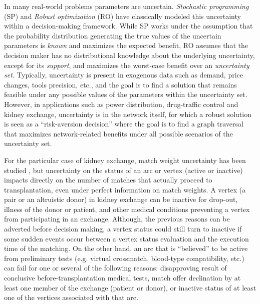 \documentclass{article}
\begin{document}
	In many real-world problems parameters are uncertain. \textit{Stochastic programming} (SP) and \textit{Robust optimization} (RO) have classically modeled this uncertainty within a decision-making framework. While SP works under the assumption that the probability distribution generating the true values of the uncertain parameters is \textit{known} and maximizes the expected benefit, RO assumes that the decision maker has no distributional knowledge about the underlying uncertainty, except for its \textit{support}, and maximizes the worst-case benefit over an \textit{uncertainty set}. Typically, uncertainty is present in exogenous data such as demand, price changes, tools precision, etc., and the goal is to find a solution that remains feasible under any possible values of the parameters within the uncertainty set. However, in applications such as power distribution, drug-traffic control and kidney exchange, uncertainty is in the network itself, for which a robust solution is seen as a ``risk-aversion decision'' where the goal is to find a graph traversal that maximizes network-related benefits under all possible scenarios of the uncertainty set. 
	
	For the particular case of kidney exchange, match weight uncertainty has been studied \citep{Duncan2019}, but uncertainty on the status of an arc or vertex (active or inactive) impacts directly on the number of matches that actually proceed to transplantation, even under perfect information on match weights. A vertex (a pair or an altruistic donor) in kidney exchange can be inactive for drop-out, illness of the donor or patient, and other medical conditions preventing a vertex from participating in an exchange. Although, the previous reasons can be adverted before decision making, a vertex status could still turn to inactive if some sudden events occur between a vertex status evaluation and the execution time of the matching. On the other hand, an arc that is ``believed'' to be active from preliminary tests (e.g. virtual crossmatch, blood-type compatibility, etc.) can fail for one or several of the following reasons: disapproving result of conclusive before-transplantation medical tests, match offer declination by at least one member of the exchange (patient or donor), or inactive status of at least one of the vertices associated with that arc.
	
\end{document}
